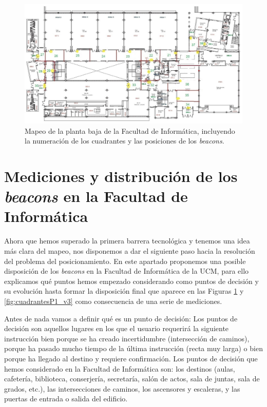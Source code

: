 \begin{figure}[t]
	\centering
	\includegraphics[width=1\textwidth]{Imagenes/Descripciondeltrabajo/mapaplantabaja_cuadrantes3}
	\caption{Mapeo de la planta baja de la Facultad de Informática, incluyendo la numeración de los cuadrantes y las posiciones de los \textit{beacons}.}
	\label{fig:cuadrantesPbaja}
\end{figure}

\section{Mediciones y distribución de los \textit{beacons} en la Facultad de Informática}
\label{sec:medicionesbeacons}

Ahora que hemos superado la primera barrera tecnológica y tenemos una idea más clara del mapeo, nos disponemos a dar el siguiente paso hacia la resolución del problema del posicionamiento. En este apartado proponemos una posible disposición de los \textit{beacons} en la Facultad de Informática de la UCM, para ello explicamos qué puntos hemos empezado considerando como puntos de decisión y su evolución hasta formar la disposición final que aparece en las Figuras \ref{fig:cuadrantesPbaja} y \ref{fig:cuadrantesP1_v3} como consecuencia de una serie de mediciones.

Antes de nada vamos a definir qué es un punto de decisión: Los puntos de decisión son aquellos lugares en los que el usuario requerirá la siguiente instrucción bien porque se ha creado incertidumbre (intersección de caminos), porque ha pasado mucho tiempo de la última instrucción (recta muy larga) o bien porque ha llegado al destino y requiere confirmación. Los puntos de decisión que hemos considerado en la Facultad de Informática son: los destinos (aulas, cafetería, biblioteca, conserjería, secretaría, salón de actos, sala de juntas, sala de grados, etc.), las intersecciones de caminos, los ascensores y escaleras, y las puertas de entrada o salida del edificio.

